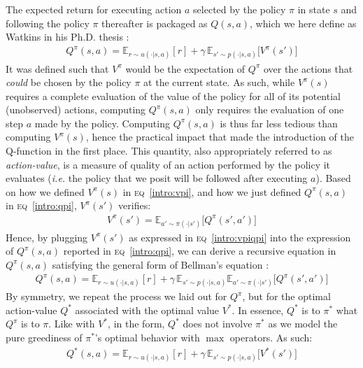 The expected return for executing action $a$ selected by the policy $\pi$
in state $s$ and following the policy $\pi$
thereafter is packaged as $Q(s,a)$, which we here define as Watkins in his Ph.D. thesis \cite{Watkins1989-ir}:
\begin{align}
Q^\pi(s,a)
= \mathbb{E}_{r \sim u(\cdot|s,a)}[r]
+ \gamma \,
\mathbb{E}_{s' \sim p(\cdot|s,a)}\big[V^\pi(s')\big]
\label{intro:qpi}
\end{align}
It was defined such that $V^\pi$ would be the expectation of $Q^\pi$ over the actions that
\emph{could} be chosen by the policy $\pi$ at the current state.
As such, while $V^\pi(s)$ requires a complete evaluation of the value of the policy for all of its
potential (unobserved) actions, computing $Q^\pi(s,a)$ only requires the evaluation of one step $a$
made by the policy. Computing $Q^\pi(s,a)$ is thus far less tedious than computing $V^\pi(s)$,
hence the practical impact that made the introduction of the Q-function in the first place.
This quantity, also appropriately referred to as \emph{action-value}, is a measure of quality
of an action performed by the policy it evaluates (\textit{i.e.} the policy that we posit will be followed
after executing $a$).
Based on how we defined $V^\pi(s)$ in \textsc{eq}~\ref{intro:vpi},
and how we just defined $Q^\pi(s,a)$ in \textsc{eq}~\ref{intro:qpi}, $V^\pi(s')$ verifies:
\begin{align}
V^\pi(s')
= \mathbb{E}_{a' \sim \pi(\cdot|s')}
\big[
Q^\pi(s',a')
\big]
\label{intro:vpiqpi}
\end{align}
Hence, by plugging $V^\pi(s')$ as expressed in \textsc{eq}~\ref{intro:vpiqpi}
into the expression of $Q^\pi(s,a)$ reported in \textsc{eq}~\ref{intro:qpi},
we can derive a recursive equation in $Q^\pi(s,a)$ satisfying the general form of Bellman's equation
\cite{Bellman1957-om}:
\begin{align}
Q^\pi(s,a)
= \mathbb{E}_{r \sim u(\cdot|s,a)}[r]
+ \gamma \,
\mathbb{E}_{s' \sim p(\cdot|s,a)}
\mathbb{E}_{a' \sim \pi(\cdot|s')}
\big[
Q^\pi(s',a')
\big]
\label{intro:qpifull}
\end{align}
By symmetry, we repeat the process we laid out for $Q^\pi$,
but for the optimal action-value $Q^*$
associated with the optimal value $V^*$.
In essence, $Q^*$ is to $\pi^*$ what $Q^\pi$ is to $\pi$.
Like with $V^*$, in the form, $Q^*$ does not involve $\pi^*$
as we model the pure greediness of $\pi^*$'s optimal behavior with $\max$ operators.
As such:
\begin{align}
Q^*(s,a)
= \mathbb{E}_{r \sim u(\cdot|s,a)}[r]
+ \gamma \,
\mathbb{E}_{s' \sim p(\cdot|s,a)}\big[V^*(s')\big]
\label{intro:qstar}
\end{align}
